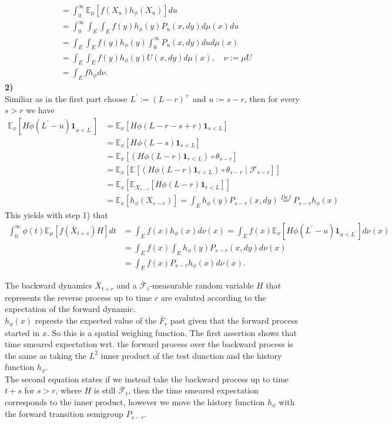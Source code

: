 \documentclass[a4paper,12pt,twoside]{article}
\begin{document}
{\begin{align*}
        &= \int_0^\infty \mathbb{E}_\mu [ f(X_u) h_\phi (X_u) ] du \\
        &= \int_0^\infty \int_E \int_E f(y) h_\phi (y) P_u (x,dy) d \mu (x) d u \\
        &= \int_E \int_E f(y) h_\phi (y) \int_0^\infty P_u (x,dy) du d \mu (x) \\
        &= \int_E \int_E f(y) h_\phi (y) U(x,dy) d \mu (x), \quad \nu := \mu U \\
        &=\int_E f h_\phi d \nu.    
    \end{align*}
\textbf{2)}\\
Similiar as in the first part choose $L^\prime := (L-r)^+$ and $u := s-r$, then for every $s>r$ we have 
\begin{align*}
    \mathbb{E}_x [ H \phi (L^\prime -u) \textbf{1}_{u<L^\prime} ] &= \mathbb{E}_x[ H \phi (L-r-s+r) \textbf{1}_{s<L} ]\\
    &= \mathbb{E}_x [ H \phi (L-s) \textbf{1}_{s<L} ]\\
    &= \mathbb{E}_x[ (H \phi (L -r) \textbf{1}_{r<L}) \circ \theta_{s-r} ]\\
    &= \mathbb{E}_x[  \mathbb{E}[ (H\phi(L-r)\textbf{1}_{r<L}) \circ \theta_{s-r} \mid \mathcal{F}_{s-r} ] ]\\
    &= \mathbb{E}_x[ \mathbb{E}_{X_{s-r}}[ H \phi (L -r) \textbf{1}_{r< L} ] ]\\
    &= \mathbb{E}_x[ h_\phi (X_{s-r}) ] = \int_E h_\phi (y) P_{s-r}(x,dy) \stackrel{Def}{=} P_{s-r} h_\phi (x)
\end{align*}
This yields with step 1) that 
\begin{align*}
    \int_0^\infty \phi (t) \mathbb{E}_\mu [ f(\bar{X}_{t+s}) H] dt &= \int_E f(x) h_\phi (x) d \nu (x) = \int_E f(x) \mathbb{E}_x[H \phi(L^\prime -u) \textbf{1}_{u<L^\prime} ] d \nu (x)\\
    &=  \int_E f(x) \int_E h_\phi (y) P_{s-r} (x,dy)  d \nu (x)\\
    &= \int_E f(x) P_{s-r} h_\phi (x) d \nu (x). 
\end{align*}



}
The backward dynamics $\bar{X}_{t+r}$ and a $\bar{\mathcal{F}}_t$-measurable random variable $H$ that represents the reverse process up to time $r$ are evaluted according to the expectation of the forward dynamic. \\
$h_\phi (x)$ represts the expected value of the $\bar{F}_r$ past given that the forward process started in $x$. So this is a spatial weighing function. The first assertion shows that time smeared expectation wrt. the forward process over the backward process is the same as taking the $L^2$ inner product of the test dunction and the history function $h_\phi$.\\
The second equation states if we instead take the backward process up to time $t+s$ for $s>r$, where $H$ is still $\bar{\mathcal{F}}_t$, then the time smeared expectation corresponds to the inner product, however we move the history function $h_\phi$ with the forward transition semigroup $P_{s-r}$.
\end{document}
